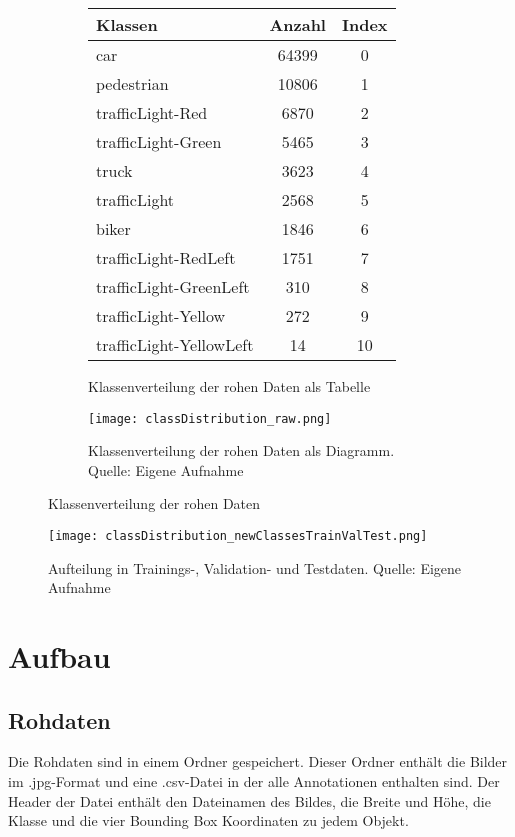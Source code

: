 \begin{figure}
	\begin{subfigure}{0.5\textwidth}
		\centering
		\begin{tabular}{l|c|c}
			\hline
			Klassen & Anzahl & Index \\
			\hline
			\hline
			car & 64399 & 0 \\
			pedestrian & 10806 & 1 \\
			trafficLight-Red & 6870 & 2 \\
			trafficLight-Green & 5465 & 3 \\
			truck & 3623 & 4 \\
			trafficLight & 2568 & 5 \\
			biker & 1846 & 6 \\
			trafficLight-RedLeft & 1751 & 7 \\
			trafficLight-GreenLeft & 310 & 8 \\
			trafficLight-Yellow & 272 & 9 \\
			trafficLight-YellowLeft & 14 & 10 \\
			\hline
		\end{tabular}
		\caption{Klassenverteilung der rohen Daten als Tabelle}
		\label{tab:classDistributionRaw_graph}
	\end{subfigure}%
	\begin{subfigure}{0.5\textwidth}
	\centering
	\texttt{[image: classDistribution\_raw.png]}
	\caption[Klassenverteilung der rohen Daten als Diagramm]{Klassenverteilung der rohen Daten als Diagramm. Quelle: Eigene Aufnahme}
	\label{fig:classDistributionRaw_graph}
	\end{subfigure}%
	\caption{Klassenverteilung der rohen Daten}
	\label{fig:classDistributionRaw}
\end{figure}


\begin{figure}
	\centering
		\texttt{[image: classDistribution\_newClassesTrainValTest.png]}
		\caption[Aufteilung in Trainings-, Validation- und Testdaten]{Aufteilung in Trainings-, Validation- und Testdaten. Quelle: Eigene Aufnahme}
		\label{fig:datasetTrainValTestSplit}
\end{figure}


\section{Aufbau}
\subsection{Rohdaten}
Die Rohdaten sind in einem Ordner gespeichert. Dieser Ordner enthält die Bilder im .jpg-Format und eine .csv-Datei in der alle Annotationen enthalten sind. Der Header der Datei enthält den Dateinamen des Bildes, die Breite und Höhe, die Klasse und die vier Bounding Box Koordinaten zu jedem Objekt.

